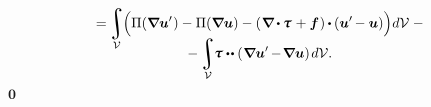 \begin{otherlanguage}{russian}
\nopagebreak\vspace{-0.4em}\begin{multline*}
= \hspace{-0.2ex}
\integral\displaylimits_{\mathcal{V}} \hspace{-0.64ex}
\left(^{\mathstrut} \hspace{-0.1ex}
\Pi(\boldnabla \bm{u}'\hspace{.1ex}) - \Pi(\boldnabla \bm{u}) -
( \hspace{.12ex} \hspace{.4ex} \tikzmark{beginBalanceIsZero} \hspace{-0.4ex} \boldnabla \hspace{-0.1ex} \dotp \hspace{-0.1ex} \mathboldtau \hspace{.15ex} + \bm{f} \hspace{-0.25ex} \tikzmark{endBalanceIsZero} \hspace{.25ex} \hspace{.12ex} ) \hspace{-0.1ex} \dotp \hspace{-0.1ex} ( \bm{u}' \hspace{-0.2ex} - \bm{u} ) \right) \hspace{-0.32ex} d\mathcal{V}
\hspace{.6ex} -
\\[-1.2em]
- \integral\displaylimits_{\mathcal{V}} \hspace{-0.64ex} \mathboldtau \dotdotp ( \hspace{.1ex} \boldnabla \bm{u}' \hspace{-0.2ex} - \hspace{-0.32ex} \boldnabla \bm{u} ) \hspace{.25ex} d\mathcal{V} .
\end{multline*}
%
%
{${\scriptstyle \bm{0}}$}


\end{otherlanguage}

